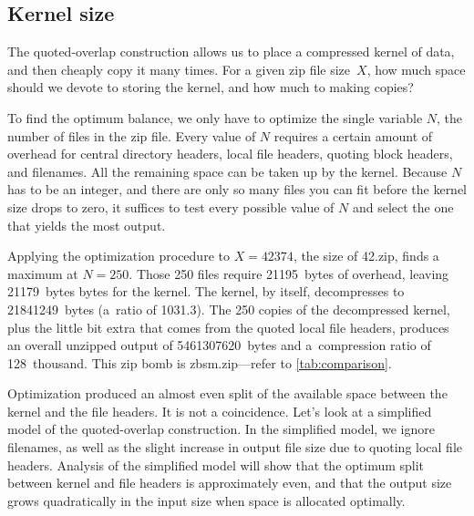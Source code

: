 \documentclass[letterpaper,twocolumn,10pt]{article}
\begin{document}

\subsection{Kernel size}
\label{sec:allocation}

The quoted-overlap construction
allows us to place a compressed kernel of data,
and then cheaply copy it many times.
For a given zip file size~$X$,
how much space should we devote to storing the kernel,
and how much to making copies?

To find the optimum balance,
we only have to optimize the single variable $N$,
the number of files in the zip file.
Every value of $N$ requires
a certain amount of overhead for
central directory headers,
local file headers,
quoting block headers, and filenames.
All the remaining space can be taken up by the kernel.
Because $N$ has to be an integer,
and there are only so many files you can fit
before the kernel size drops to zero,
it suffices to test every possible value of $N$
and select the one that yields the most output.

Applying the optimization procedure to $X = \num{42374}$,
the size of 42.zip,
finds a maximum at $N = 250$.
Those \num{250} files require \SI{21195}{bytes} of overhead,
leaving \SI{21179}{bytes} bytes for the kernel.
The kernel, by itself, decompresses to \SI{21841249}{bytes}
(a~ratio of \num{1031.3}).
The \num{250} copies of the decompressed kernel,
plus the little bit extra that comes from the quoted local file headers,
produces an overall unzipped output of
\SI{5461307620}{bytes}
and a~compression ratio of 128~thousand.
This zip bomb is \mbox{zbsm.zip}---refer to \autoref{tab:comparison}.

Optimization produced an almost even split
of the available space
between the kernel and the file headers.
It is not a coincidence.
Let's look at a simplified model of the quoted-overlap construction.
In the simplified model,
we ignore filenames,
as well as the slight increase in output file size
due to quoting local file headers.
Analysis of the simplified model will show that the optimum
split between kernel and file headers is approximately even,
and that the output size grows quadratically in the input size
when space is allocated optimally.
\end{document}
